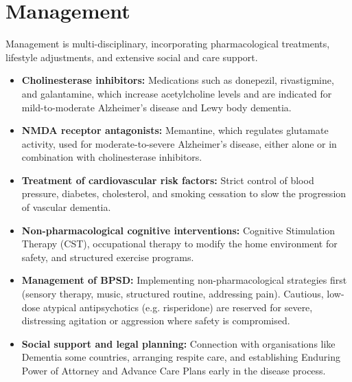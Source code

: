 \section*{Management}
Management is multi-disciplinary, incorporating pharmacological treatments, lifestyle adjustments, and extensive social and care support.
\begin{itemize}
    \item \textbf{Cholinesterase inhibitors:} Medications such as donepezil, rivastigmine, and galantamine, which increase acetylcholine levels and are indicated for mild-to-moderate Alzheimer's disease and Lewy body dementia.
    \item \textbf{NMDA receptor antagonists:} Memantine, which regulates glutamate activity, used for moderate-to-severe Alzheimer's disease, either alone or in combination with cholinesterase inhibitors.
    \item \textbf{Treatment of cardiovascular risk factors:} Strict control of blood pressure, diabetes, cholesterol, and smoking cessation to slow the progression of vascular dementia.
    \item \textbf{Non-pharmacological cognitive interventions:} Cognitive Stimulation Therapy (CST), occupational therapy to modify the home environment for safety, and structured exercise programs.
    \item \textbf{Management of BPSD:} Implementing non-pharmacological strategies first (sensory therapy, music, structured routine, addressing pain). Cautious, low-dose atypical antipsychotics (e.g. risperidone) are reserved for severe, distressing agitation or aggression where safety is compromised.
    \item \textbf{Social support and legal planning:} Connection with organisations like Dementia some countries, arranging respite care, and establishing Enduring Power of Attorney and Advance Care Plans early in the disease process.
\end{itemize}

